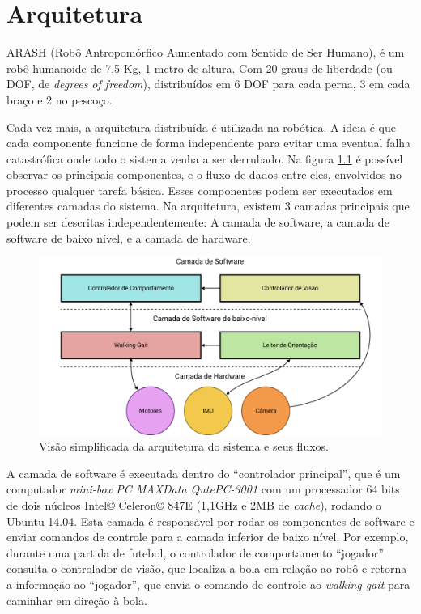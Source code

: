 \chapter{Arquitetura}

ARASH (Robô Antropomórfico Aumentado com Sentido de Ser Humano), é um robô humanoide de 7,5 Kg, 1 metro de altura. Com 20 graus de liberdade (ou DOF, de \textit{degrees of freedom}), distribuídos em 6 DOF para cada perna, 3 em cada braço e 2 no pescoço.

Cada vez mais, a arquitetura distribuída é utilizada na robótica. A ideia é que cada componente funcione de forma independente para evitar uma eventual falha catastrófica onde todo o sistema venha a ser derrubado. Na figura \ref{fig:SoftwareArchitecture:Overview} é possível observar os principais componentes, e o fluxo de dados entre eles, envolvidos no processo qualquer tarefa básica. Esses componentes podem ser executados em diferentes camadas do sistema. Na arquitetura, existem 3 camadas principais que podem ser descritas independentemente: A camada de software, a camada de software de baixo nível, e a camada de hardware.

\begin{figure}[htb]
	\centering
	\includegraphics[scale=1]{imagens/svg/softwarearchitecture-flow}
	\caption{Visão simplificada da arquitetura do sistema e seus fluxos.}
	\label{fig:SoftwareArchitecture:Overview}
\end{figure}

A camada de software é executada dentro do ``controlador principal'', que é um computador \textit{mini-box PC MAXData QutePC-3001} com um processador 64 bits de dois núcleos Intel\copyright{} Celeron\copyright{} 847E (1,1GHz e 2MB de \textit{cache}), rodando o Ubuntu 14.04. Esta camada é responsável por rodar os componentes de software e enviar comandos de controle para a camada inferior de baixo nível. Por exemplo, durante uma partida de futebol, o controlador de comportamento ``jogador'' consulta o controlador de visão, que localiza a bola em relação ao robô e retorna a informação ao ``jogador'', que envia o comando de controle ao \textit{walking gait} para caminhar em direção à bola.

